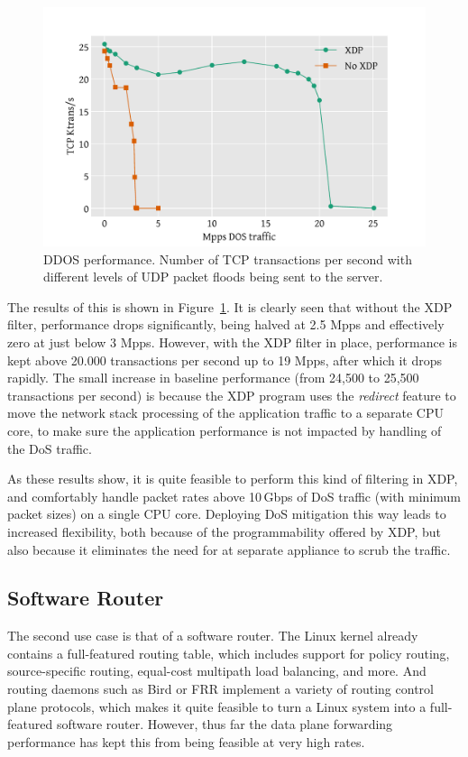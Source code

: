 \documentclass[10pt,sigconf]{acmart}
\begin{document}
\begin{figure}[t]
\centering
\includegraphics[width=\linewidth]{figures/ddos-test.pdf}
\caption{\label{fig:ddos-results} DDOS performance. Number of TCP transactions
  per second with different levels of UDP packet floods being sent to the
  server.}
\end{figure}

The results of this is shown in Figure~\ref{fig:ddos-results}. It is clearly
seen that without the XDP filter, performance drops significantly, being halved
at 2.5 Mpps and effectively zero at just below 3 Mpps. However, with the XDP
filter in place, performance is kept above 20.000 transactions per second up to
19 Mpps, after which it drops rapidly. The small increase in baseline
performance (from 24,500 to 25,500 transactions per second) is because the XDP
program uses the \emph{redirect} feature to move the network stack processing of
the application traffic to a separate CPU core, to make sure the application
performance is not impacted by handling of the DoS traffic.

As these results show, it is quite feasible to perform this kind of filtering in
XDP, and comfortably handle packet rates above 10\,Gbps of DoS traffic (with
minimum packet sizes) on a single CPU core. Deploying DoS mitigation this way
leads to increased flexibility, both because of the programmability offered by
XDP, but also because it eliminates the need for at separate appliance to scrub
the traffic.

\subsection{Software Router}
\label{sec:fwd-usecase}
The second use case is that of a software router. The Linux kernel already
contains a full-featured routing table, which includes support for policy
routing, source-specific routing, equal-cost multipath load balancing, and more.
And routing daemons such as Bird or FRR implement a variety of routing control
plane protocols, which makes it quite feasible to turn a Linux system into a
full-featured software router. However, thus far the data plane forwarding
performance has kept this from being feasible at very high rates.
\end{document}
